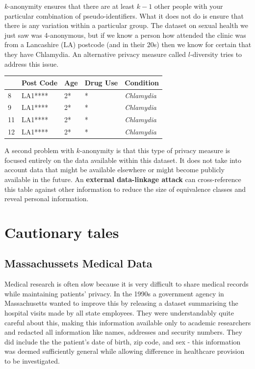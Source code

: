 \documentclass[
  12pt,
]{book}
\begin{document}
\(k\)-anonymity ensures that there are at least \(k-1\) other people with your particular combination of pseudo-identifiers. What it does not do is ensure that there is any variation within a particular group. The dataset on sexual health we just saw was 4-anonymous, but if we know a person how attended the clinic was from a Lancashire (LA) postcode (and in their 20s) then we know for certain that they have Chlamydia. An alternative privacy measure called \(l\)-diversity tries to address this issue.

\begin{longtable}[]{@{}lllll@{}}
\toprule()
& Post Code & Age & Drug Use & Condition \\
\midrule()
\endhead
8 & LA1**** & 2* & * & \emph{Chlamydia} \\
9 & LA1**** & 2* & * & \emph{Chlamydia} \\
11 & LA1**** & 2* & * & \emph{Chlamydia} \\
12 & LA1**** & 2* & * & \emph{Chlamydia} \\
\bottomrule()
\end{longtable}

A second problem with \(k\)-anonymity is that this type of privacy measure is focused entirely on the data available within this dataset. It does not take into account data that might be available elsewhere or might become publicly available in the future. An \textbf{external data-linkage attack} can cross-reference this table against other information to reduce the size of equivalence classes and reveal personal information.

\hypertarget{cautionary-tales}{%
\section{Cautionary tales}\label{cautionary-tales}}

\hypertarget{massachussets-medical-data}{%
\subsection{Massachussets Medical Data}\label{massachussets-medical-data}}

Medical research is often slow because it is very difficult to share medical records while maintaining patients' privacy. In the 1990s a government agency in Massachusetts wanted to improve this by releasing a dataset summarising the hospital visits made by all state employees. They were understandably quite careful about this, making this information available only to academic researchers and redacted all information like names, addresses and security numbers. They did include the the patient's date of birth, zip code, and sex - this information was deemed sufficiently general while allowing difference in healthcare provision to be investigated.
\end{document}
